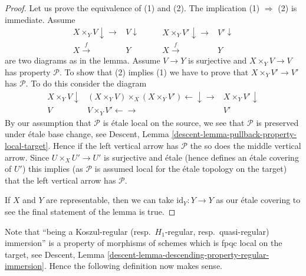 \begin{proof}
Let us prove the equivalence of (1) and (2).
The implication (1) $\Rightarrow$ (2) is immediate.
Assume
$$
\begin{array}{cc}X \times_Y V \downarrow\longrightarrow & V \downarrow \\ X \overset{f}{\longrightarrow} & Y\end{array}
\quad\quad
\begin{array}{cc}X \times_Y V' \downarrow\longrightarrow & V' \downarrow \\ X \overset{f}{\longrightarrow} & Y\end{array}
$$
are two diagrams as in the lemma. Assume $V \to Y$ is
surjective and $X \times_Y V \to V$ has property $\mathcal{P}$.
To show that (2) implies (1) we have to prove that
$X \times_Y V' \to V'$ has $\mathcal{P}$. To do
this consider the diagram
$$
\begin{array}{ccc}X \times_Y V \downarrow & (X \times_Y V) \times_X (X \times_Y V') \longleftarrow\downarrow\longrightarrow & X \times_Y V' \downarrow \\ V & V \times_Y V' \longleftarrow\longrightarrow & V'\end{array}
$$
By our assumption that $\mathcal{P}$ is \'etale local on the source,
we see that $\mathcal{P}$ is preserved under \'etale base change, see
Descent, Lemma \ref{descent-lemma-pullback-property-local-target}.
Hence if the left vertical arrow has $\mathcal{P}$ the so does
the middle vertical arrow. Since $U \times_X U' \to U'$ is surjective
and \'etale (hence defines an \'etale covering of $U'$)
this implies (as $\mathcal{P}$ is assumed local for the \'etale topology
on the target) that the left vertical arrow has $\mathcal{P}$.

\medskip\noindent
If $X$ and $Y$ are representable, then we can take
$\text{id}_Y : Y \to Y$ as our \'etale covering to see the
final statement of the lemma is true.
\end{proof}

Note that ``being a Koszul-regular (resp.\ $H_1$-regular, resp.\ quasi-regular)
immersion'' is a property of morphisms of schemes which is fpqc local on the
target, see
Descent, Lemma \ref{descent-lemma-descending-property-regular-immersion}.
Hence the following definition now makes sense.

